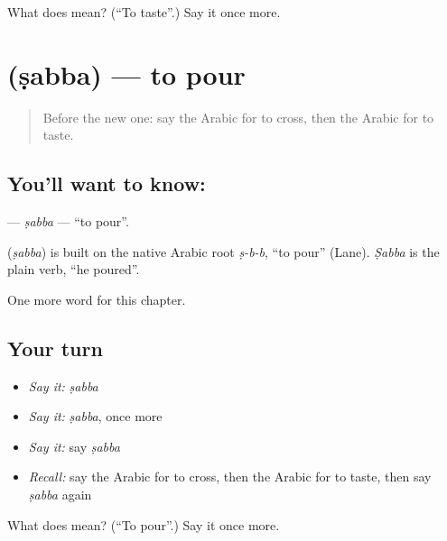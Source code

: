 \begin{tcolorbox}[breakable,colback=teal!4,colframe=teal!35!black,title={Before you move on}]
What does  mean? (\textquotedblleft{}To taste\textquotedblright{}.) Say it once more.
\end{tcolorbox}
\section[\texorpdfstring{\ar{صب} (ṣabba)}{صب (ṣabba)}]{ (ṣabba) — to pour}

\label{lesson:AR-C160-sabba}



\begin{quote}
Before the new one: say the Arabic for to cross, then the Arabic for to taste.
\end{quote}

\subsection*{You'll want to know: }
\textbf{} — \emph{ṣabba} — \textquotedblleft{}to pour\textquotedblright{}.

\begin{cousinweb}
\textbf{} (\emph{ṣabba}) is built on the native Arabic root \emph{ṣ-b-b}, \textquotedblleft{}to pour\textquotedblright{} (Lane). \emph{Ṣabba} is the plain verb, \textquotedblleft{}he poured\textquotedblright{}.
\end{cousinweb}

\begin{grammarlens}[title={What you've built}]
One more word for this chapter.
\end{grammarlens}

\subsection*{Your turn}
\begin{itemize}
\raggedright
  \item \emph{Say it:} \emph{ṣabba}
  \item \emph{Say it:} \emph{ṣabba}, once more
  \item \emph{Say it:} say \emph{ṣabba}
  \item \emph{Recall:} say the Arabic for to cross, then the Arabic for to taste, then say \emph{ṣabba} again
\end{itemize}

\begin{tcolorbox}[breakable,colback=teal!4,colframe=teal!35!black,title={Before you move on}]
What does  mean? (\textquotedblleft{}To pour\textquotedblright{}.) Say it once more.
\end{tcolorbox}
